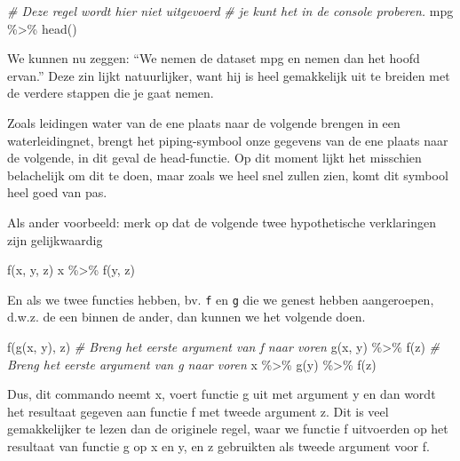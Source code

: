 \documentclass[]{tufte-book}
\newenvironment{Shaded}{}{}
\newcommand{\CommentTok}[1]{\textcolor[rgb]{0.38,0.63,0.69}{\textit{#1}}}
\newcommand{\FunctionTok}[1]{\textcolor[rgb]{0.02,0.16,0.49}{#1}}
\newcommand{\NormalTok}[1]{#1}
\newcommand{\SpecialCharTok}[1]{\textcolor[rgb]{0.25,0.44,0.63}{#1}}
\begin{document}
\begin{Shaded}
\begin{Highlighting}[]
\CommentTok{\# Deze regel wordt hier niet uitgevoerd}
\CommentTok{\# je kunt het in de console proberen.}
\NormalTok{mpg }\SpecialCharTok{\%\textgreater{}\%} \FunctionTok{head}\NormalTok{()}
\end{Highlighting}
\end{Shaded}

We kunnen nu zeggen: ``We nemen de dataset mpg en nemen dan het hoofd ervan.'' Deze zin lijkt natuurlijker, want hij is heel gemakkelijk uit te breiden met de verdere stappen die je gaat nemen.

Zoals leidingen water van de ene plaats naar de volgende brengen in een waterleidingnet, brengt het piping-symbool onze gegevens van de ene plaats naar de volgende, in dit geval de head-functie. Op dit moment lijkt het misschien belachelijk om dit te doen, maar zoals we heel snel zullen zien, komt dit symbool heel goed van pas.

Als ander voorbeeld: merk op dat de volgende twee hypothetische verklaringen zijn gelijkwaardig

\begin{Shaded}
\begin{Highlighting}[]
\FunctionTok{f}\NormalTok{(x, y, z)}
\NormalTok{x }\SpecialCharTok{\%\textgreater{}\%} \FunctionTok{f}\NormalTok{(y, z)}
\end{Highlighting}
\end{Shaded}

En als we twee functies hebben, bv. \texttt{f} en \texttt{g} die we genest hebben aangeroepen, d.w.z. de een binnen de ander, dan kunnen we het volgende doen.

\begin{Shaded}
\begin{Highlighting}[]
\FunctionTok{f}\NormalTok{(}\FunctionTok{g}\NormalTok{(x, y), z)}
\CommentTok{\# Breng het eerste argument van f naar voren}
\FunctionTok{g}\NormalTok{(x, y) }\SpecialCharTok{\%\textgreater{}\%} \FunctionTok{f}\NormalTok{(z)}
\CommentTok{\# Breng het eerste argument van g naar voren}
\NormalTok{x }\SpecialCharTok{\%\textgreater{}\%}
  \FunctionTok{g}\NormalTok{(y) }\SpecialCharTok{\%\textgreater{}\%}
  \FunctionTok{f}\NormalTok{(z)}
\end{Highlighting}
\end{Shaded}

Dus, dit commando neemt x, voert functie g uit met argument y en dan wordt het resultaat gegeven aan functie f met tweede argument z. Dit is veel gemakkelijker te lezen dan de originele regel, waar we functie f uitvoerden op het resultaat van functie g op x en y, en z gebruikten als tweede argument voor f.
\end{document}
